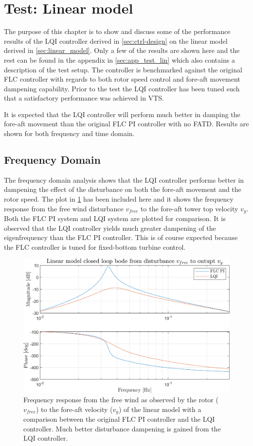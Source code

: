 \section{Test: Linear model} \label{sec:test_lin}
The purpose of this chapter is to show and discuss some of the performance results of the LQI controller derived in \cref{sec:ctrl-design} on the linear model derived in \cref{sec:linear_model}. Only a few of the results are shown here and the rest can be found in the appendix in \cref{sec:app_test_lin} which also contains a description of the test setup. The controller is benchmarked against the original FLC controller with regards to both rotor speed control and fore-aft movement dampening capability. Prior to the test the LQI controller has been tuned such that a satisfactory performance was achieved in VTS.

It is expected that the LQI controller will perform much better in damping the fore-aft movement than the original FLC PI controller with no FATD. Results are shown for both frequency and time domain.


\subsection{Frequency Domain}
The frequency domain analysis shows that the LQI controller performs better in dampening the effect of the disturbance on both the fore-aft movement and the rotor speed. The plot in \cref{fig:script_vfreeTovy} has been included here and it shows the frequency response from the free wind disturbance $ v_{free} $ to the fore-aft tower top velocity $ v_y $. Both the FLC PI system and LQI system are plotted for comparison. It is observed that the LQI controller yields much greater dampening of the eigenfrequency than the FLC PI controller. This is of course expected because the FLC controller is tuned for fixed-bottom turbine control.
\begin{figure}[ht]
	\centering
	\includegraphics[width=0.7\linewidth]{Graphics/TestResults/linearModPerf/script_vfreeTovy.png}
	\caption{Frequency response from the free wind as observed by the rotor ($ v_{free} $) to the fore-aft velocity ($ v_y $) of the linear model with a comparison between the original FLC PI controller and the LQI controller. Much better disturbance dampening is gained from the LQI controller.}
	\label{fig:script_vfreeTovy}
\end{figure}


